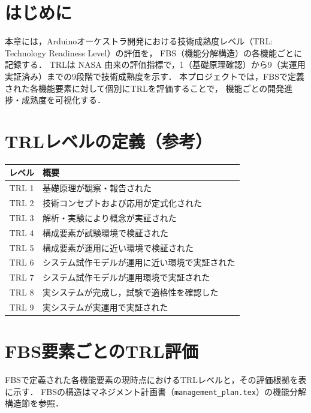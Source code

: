 
\section{はじめに}
本章には，Arduinoオーケストラ開発における技術成熟度レベル（TRL: Technology Readiness Level）の評価を，
FBS（機能分解構造）の各機能ごとに記録する．
TRLは NASA 由来の評価指標で，1（基礎原理確認）から9（実運用実証済み）までの9段階で技術成熟度を示す．
本プロジェクトでは，FBSで定義された各機能要素に対して個別にTRLを評価することで，
機能ごとの開発進捗・成熟度を可視化する．

\section{TRLレベルの定義（参考）}

\begin{table}[H]
  \centering
  \begin{tabularx}{\linewidth}{cX}
    \toprule
    レベル & 概要 \\
    \midrule
    TRL 1 & 基礎原理が観察・報告された \\
    TRL 2 & 技術コンセプトおよび応用が定式化された \\
    TRL 3 & 解析・実験により概念が実証された \\
    TRL 4 & 構成要素が試験環境で検証された \\
    TRL 5 & 構成要素が運用に近い環境で検証された \\
    TRL 6 & システム試作モデルが運用に近い環境で実証された \\
    TRL 7 & システム試作モデルが運用環境で実証された \\
    TRL 8 & 実システムが完成し，試験で適格性を確認した \\
    TRL 9 & 実システムが実運用で実証された \\
    \bottomrule
  \end{tabularx}
\end{table}

\section{FBS要素ごとのTRL評価}

FBSで定義された各機能要素の現時点におけるTRLレベルと，その評価根拠を表に示す．
FBSの構造はマネジメント計画書（\texttt{management\_plan.tex}）の機能分解構造節を参照．

